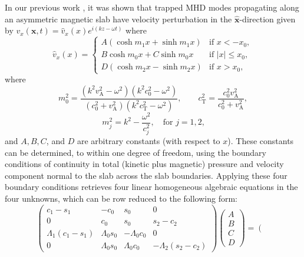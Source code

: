 \documentclass[namedreferences]{solarphysics}
\numberwithin{equation}{section}
\begin{document}
\begin{article}
In our previous work \citep{all_etal17}, it was shown that trapped MHD modes propagating along an asymmetric magnetic slab have velocity perturbation in the $\mathbf{\widehat{x}}$-direction given by $v_x(\mathbf{x}, t) = \widehat{v}_x(x)e^{i(kz-\omega t)}$ where
\begin{equation}
\widehat{v}_x(x)=
\begin{cases}
A(\cosh{m_1x}+\sinh{m_1x}) & \text{if }x<-x_0, \\
B\cosh{m_0x}+C\sinh{m_0x} & \text{if }|x|\leq{x_0}, \\
D(\cosh{m_2x}-\sinh{m_2x}) & \text{if  }x>x_0, \label{vsoln}
\end{cases}
\end{equation}
where
\begin{equation}
m_0^2=\frac{(k^2v_\textrm{A}^2-\omega^2)(k^2c_0^2-\omega^2)}{(c_0^2+v_\textrm{A}^2)(k^2c_\textrm{T}^2-\omega^2)}, \qquad c_\textrm{T}^2=\frac{c_0^2v_\textrm{A}^2}{c_0^2+v_\textrm{A}^2}, \label{m0}
\end{equation}
\begin{equation}
m_j^2=k^2-\frac{\omega^2}{c_j^2}, \quad \text{for $j=1,2$,} \label{m1/2}
\end{equation}
and $A, B, C$, and $D$ are arbitrary constants (with respect to $x$). These constants can be determined, to within one degree of freedom, using the boundary conditions of continuity in total (kinetic plus magnetic) pressure and velocity component normal to the slab across the slab boundaries. Applying these four boundary conditions retrieves four linear homogeneous algebraic equations in the four unknowns, which can be row reduced to the following form:
\begin{equation}
\left(
\begin{matrix}
c_1-s_1 &-c_0                       &s_0                        &0 \\
0       &c_0                        &s_0                        &s_2-c_2 \\
\Lambda_1(c_1-s_1)       &\Lambda_0s_0 &-\Lambda_0c_0  &0 \\
0       &\Lambda_0s_0                          &\Lambda                   _0c_0 &-\Lambda_2(s_2-c_2)
\end{matrix}
\right)
\left(
\begin{matrix}
A \\
B \\
C \\
D
\end{matrix}
\right)
=
\left(
\begin{matrix}

\end{matrix}
\end{equation}
\end{article}
\end{document}
